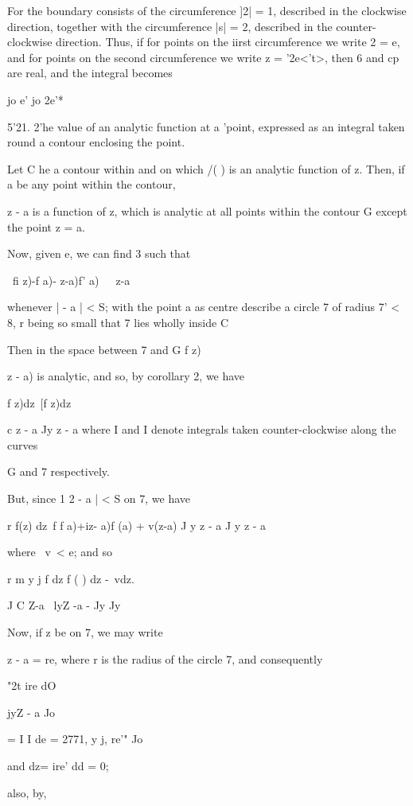 {  

%
%

For the boundary consists of the circumference ]2| = 1, described in
the clockwise direction, together with the circumference |s| = 2,
described in the counter-clockwise direction. Thus, if for points on
the iirst circumference we write 2 = e, and for points on the second
circumference we write z = '2e<'t>, then 6 and cp are real, and the
integral becomes

jo e' jo 2e'*

5'21. 2'he value of an analytic function at a 'point, expressed as an
integral taken round a contour enclosing the point.

Let C he a contour within and on which /( ) is an analytic function of
z. Then, if a be any point within the contour,

z - a is a function of z, which is analytic at all points within the
contour G except the point z = a.

Now, given e, we can find 3 such that

\ fi z)-f a)- z-a)f' a)\ \ \ z-a\

whenever | - a | < S; with the point a as centre describe a circle 7
of radius 7' < 8, r being so small that 7 lies wholly inside C

Then in the space between 7 and G f z)\ \ {z - a) is analytic, and so,
by corollary 2, we have

f z)dz\ [f z)dz

c z - a Jy z - a where I and I denote integrals taken
counter-clockwise along the curves

G and 7 respectively.

But, since 1 2 - a | < S on 7, we have

r f(z) dz\ f f a)+iz- a)f (a) + v(z-a) J y z - a J y z - a

where \ v\ < e; and so

r m y j f dz f ( ) dz -\ vdz.

J C Z-a \ lyZ -a - Jy Jy

Now, if z be on 7, we may write

z - a = re, where r is the radius of the circle 7, and consequently

"2t ire dO

jyZ - a Jo

= I I de = 2771, y j, re'" Jo

and dz= ire' dd = 0;

also, by,

}}
